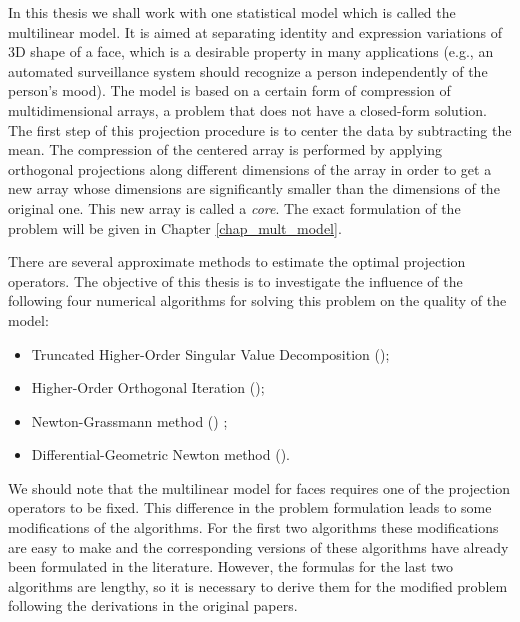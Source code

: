 In this thesis we shall work with one statistical
model which is called the multilinear model.
It is aimed at separating identity and expression variations
of 3D shape of a face, which is a desirable property in many applications 
(e.g., an automated surveillance system should recognize
a person independently of the person's mood).
The model  is based on a certain form
of compression of multidimensional arrays, a problem
that does not have a closed-form solution.
The first step of this projection procedure is to center
the data by subtracting the mean. 
The compression of the centered array is performed by applying orthogonal
projections along different dimensions of the array in order to get a 
new array whose dimensions are significantly smaller than the dimensions
of the original one. This new array is called a \textit{core}. The exact formulation
of the problem will be given in Chapter \ref{chap_mult_model}.


There are several approximate methods to estimate the optimal
projection operators.   The objective of this thesis is to investigate
the influence of the following four numerical algorithms
for solving this problem on the quality of the model: 
\begin{itemize}
\item Truncated Higher-Order Singular Value Decomposition (\cite{kolda_bader_2009});
\item Higher-Order Orthogonal Iteration (\cite{kolda_bader_2009});
\item Newton-Grassmann method (\cite{elden_savas_2009}) ;
\item Differential-Geometric Newton method (\cite{IDLAVH09}).
\end{itemize}
We should note that the multilinear model for faces requires one of the projection
operators to be fixed. This  difference in the problem formulation
leads to some modifications of the algorithms. For the first two algorithms
these modifications are easy to make and the corresponding versions of these 
algorithms have already been formulated in the literature.
However, the formulas for the last two algorithms are lengthy,
so it is necessary to derive them for the modified problem
following the derivations in the original papers.



